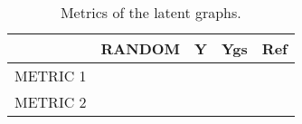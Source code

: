 \begin{table}[]
	\caption{Metrics of the latent graphs.}
	\begin{tabular}{|l|l|l|l|l|}
		\hline
		& RANDOM & Y & Ygs & Ref \\ \hline
		METRIC 1 &        &   &     &     \\ \hline
		METRIC 2 &        &   &     &     \\ \hline
	\end{tabular}
\end{table}